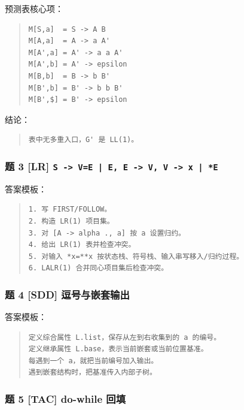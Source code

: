 \documentclass[UTF8,zihao=-4]{ctexart}
\begin{document}
预测表核心项：


\begin{quote}
\footnotesize
\begin{verbatim}
M[S,a]  = S -> A B
M[A,a]  = A -> a A'
M[A',a] = A' -> a a A'
M[A',b] = A' -> epsilon
M[B,b]  = B -> b B'
M[B',b] = B' -> b b B'
M[B',$] = B' -> epsilon
\end{verbatim}
\end{quote}


结论：


\begin{quote}
\footnotesize
\begin{verbatim}
表中无多重入口，G' 是 LL(1)。
\end{verbatim}
\end{quote}


\subsubsection{题 3 [LR] \texttt{S -> V=E | E, E -> V, V -> x | *E}}


答案模板：


\begin{quote}
\footnotesize
\begin{verbatim}
1. 写 FIRST/FOLLOW。
2. 构造 LR(1) 项目集。
3. 对 [A -> alpha ., a] 按 a 设置归约。
4. 给出 LR(1) 表并检查冲突。
5. 对输入 *x=**x 按状态栈、符号栈、输入串写移入/归约过程。
6. LALR(1) 合并同心项目集后检查冲突。
\end{verbatim}
\end{quote}


\subsubsection{题 4 [SDD] 逗号与嵌套输出}


答案模板：


\begin{quote}
\footnotesize
\begin{verbatim}
定义综合属性 L.list，保存从左到右收集到的 a 的编号。
定义继承属性 L.base，表示当前嵌套或当前位置基准。
每遇到一个 a，就把当前编号加入输出。
遇到嵌套结构时，把基准传入内部子树。
\end{verbatim}
\end{quote}


\subsubsection{题 5 [TAC] do-while 回填}
\end{document}
